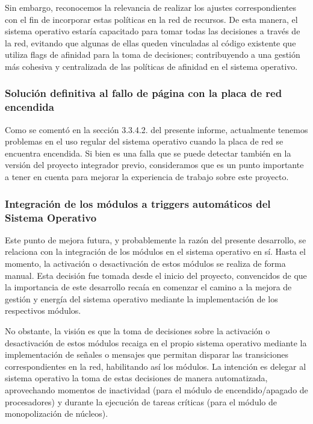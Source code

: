 Sin embargo, reconocemos la relevancia de realizar los ajustes correspondientes con el fin de incorporar estas políticas en la red de recursos. De esta manera, el sistema operativo estaría capacitado para tomar todas las decisiones a través de la red, evitando que algunas de ellas queden vinculadas al código existente que utiliza flags de afinidad para la toma de decisiones; contribuyendo a una gestión más cohesiva y centralizada de las políticas de afinidad en el sistema operativo.\par

\subsubsection{Solución definitiva al fallo de página con la placa de red encendida}
Como se comentó en la sección 3.3.4.2. del presente informe, actualmente tenemos problemas en el uso regular del sistema operativo cuando la placa de red se encuentra encendida. Si bien es una falla que se puede detectar también en la versión del proyecto integrador previo, consideramos que es un punto importante a tener en cuenta para mejorar la experiencia de trabajo sobre este proyecto.\par

\subsubsection{Integración de los módulos a triggers automáticos del Sistema Operativo}
Este punto de mejora futura, y probablemente la razón del presente desarrollo, se relaciona con la integración de los módulos en el sistema operativo en sí. Hasta el momento, la activación o desactivación de estos módulos se realiza de forma manual. Esta decisión fue tomada desde el inicio del proyecto, convencidos de que la importancia de este desarrollo recaía en comenzar el camino a la mejora de gestión y energía del sistema operativo mediante la implementación de los respectivos módulos.\par

No obstante, la visión es que la toma de decisiones sobre la activación o desactivación de estos módulos recaiga en el propio sistema operativo mediante la implementación de señales o mensajes que permitan disparar las transiciones correspondientes en la red, habilitando así los módulos. La intención es delegar al sistema operativo la toma de estas decisiones de manera automatizada, aprovechando momentos de inactividad (para el módulo de encendido/apagado de procesadores) y durante la ejecución de tareas críticas (para el módulo de monopolización de núcleos).\par
